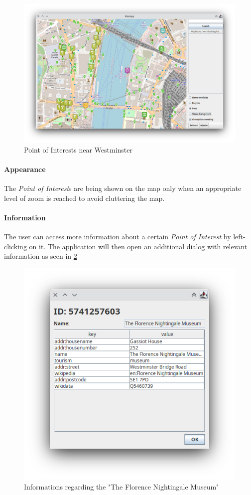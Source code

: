 \begin{figure}[H]
	\centering
	\includegraphics[width=\linewidth]{assets/mainapp1}
	\caption{Point of Interests near Westminster}
	\label{fig:mainapp1}
\end{figure}

\paragraph{Appearance}
The \textit{Point of Interest}s are being shown on the map only when an 
appropriate level of zoom is reached to avoid cluttering the map.

\paragraph{Information}
The user can access more information about a certain \textit{Point of Interest} 
by left-clicking on it. The application will then open an additional dialog 
with relevant information as seen in \ref{fig:mainappdialog1}

\begin{figure}[H]
	\centering
	\includegraphics[width=0.5\linewidth]{assets/mainapp_dialog1}
	\caption[]{
		Informations regarding the "The Florence Nightingale Museum"
	}
	\label{fig:mainappdialog1}
\end{figure}

